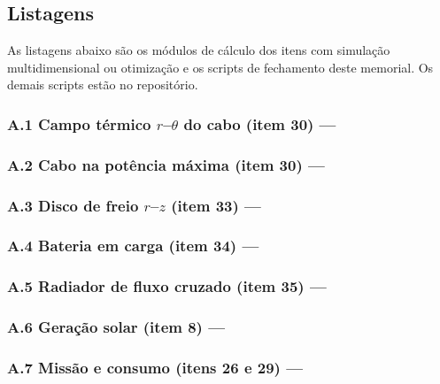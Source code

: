 \subsection*{Listagens}
As listagens abaixo são os módulos de cálculo dos itens com simulação multidimensional ou
otimização e os scripts de fechamento deste memorial. Os demais scripts estão no repositório.

\subsubsection*{A.1 Campo térmico $r$--$\theta$ do cabo (item 30) — }

\subsubsection*{A.2 Cabo na potência máxima (item 30) — }

\subsubsection*{A.3 Disco de freio $r$--$z$ (item 33) — }

\subsubsection*{A.4 Bateria em carga (item 34) — }

\subsubsection*{A.5 Radiador de fluxo cruzado (item 35) — }

\subsubsection*{A.6 Geração solar (item 8) — }

\subsubsection*{A.7 Missão e consumo (itens 26 e 29) — }

